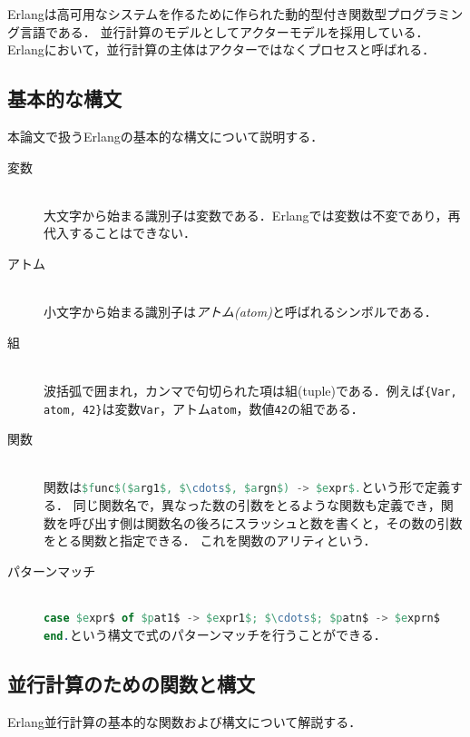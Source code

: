 Erlang\cite{Erlang}は高可用なシステムを作るために作られた動的型付き関数型プログラミング言語である．
並行計算のモデルとしてアクターモデルを採用している．
Erlangにおいて，並行計算の主体はアクターではなくプロセスと呼ばれる．

\subsection{基本的な構文}

本論文で扱うErlangの基本的な構文について説明する．

\begin{description}
\item[変数]\mbox{}\\
  大文字から始まる識別子は変数である．Erlangでは変数は不変であり，再代入することはできない．
\item[アトム]\mbox{}\\
  小文字から始まる識別子は\emph{アトム(atom)}と呼ばれるシンボルである．
\item[組]\mbox{}\\
  波括弧で囲まれ，カンマで句切られた項は組(tuple)である．例えば\lstinline|{Var, atom, 42}|は変数\lstinline{Var}，アトム\lstinline{atom}，数値\lstinline{42}の組である．
\item[関数]\mbox{}\\
  関数は\lstinline[language=Erlang]{$func$($arg1$, $\cdots$, $argn$) -> $expr$.}という形で定義する．
  同じ関数名で，異なった数の引数をとるような関数も定義でき，関数を呼び出す側は関数名の後ろにスラッシュと数を書くと，その数の引数をとる関数と指定できる．
  これを関数のアリティという．
\item[パターンマッチ]\mbox{}\\
  \lstinline[language=Erlang]{case $expr$ of $pat1$ -> $expr1$; $\cdots$; $patn$ -> $exprn$ end.}という構文で式のパターンマッチを行うことができる．
\end{description}

\subsection{並行計算のための関数と構文}

Erlang並行計算の基本的な関数および構文について解説する．

